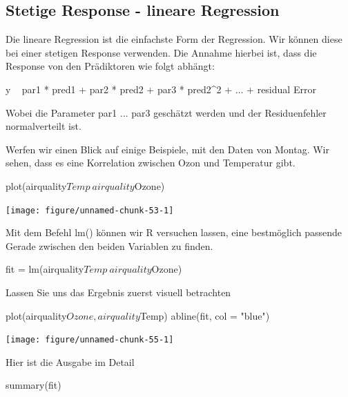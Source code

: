 \documentclass[a4paper,twoside]{tufte-book}\usepackage[]{graphicx}\usepackage[]{color}
\begin{document}
\begin{appendices}
\section{Stetige Response - lineare Regression}

Die lineare Regression ist die einfachste Form der Regression. Wir können diese bei einer stetigen Response verwenden. Die Annahme hierbei ist, dass die Response von den Prädiktoren wie folgt abhängt:

\begin{Schunk}
\begin{Sinput}
y ~ par1 * pred1 +  par2 * pred2 +  par3 * pred2^2 + ... + residual Error
\end{Sinput}
\end{Schunk}

Wobei die Parameter par1 ... par3 geschätzt werden und der Residuenfehler normalverteilt ist.

Werfen wir einen Blick auf einige Beispiele, mit den Daten von Montag. Wir sehen, dass es eine Korrelation zwischen Ozon und Temperatur gibt.

\begin{Schunk}
\begin{Sinput}
plot(airquality$Temp~airquality$Ozone)
\end{Sinput}

\texttt{[image: figure/unnamed-chunk-53-1]} \end{Schunk}

Mit dem Befehl lm() können wir R versuchen lassen, eine bestmöglich passende Gerade zwischen den beiden Variablen zu finden.

\begin{Schunk}
\begin{Sinput}
fit = lm(airquality$Temp~airquality$Ozone)
\end{Sinput}
\end{Schunk}


Lassen Sie uns das Ergebnis zuerst visuell betrachten

\begin{Schunk}
\begin{Sinput}
plot(airquality$Ozone, airquality$Temp)
abline(fit, col = "blue")
\end{Sinput}

\texttt{[image: figure/unnamed-chunk-55-1]} \end{Schunk}

Hier ist die Ausgabe im Detail

\begin{Schunk}
\begin{Sinput}
summary(fit)
\end{Sinput}
\begin{Soutput}


\end{Soutput}
\end{Schunk}
\end{appendices}
\end{document}
